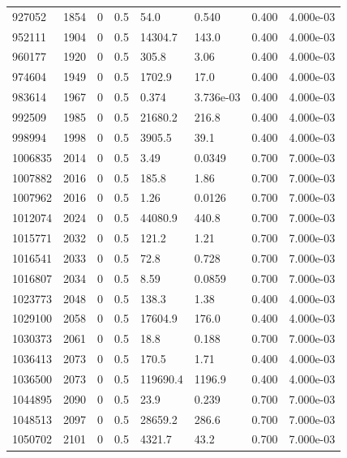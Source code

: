 \documentclass[preview]{standalone}
\begin{document}
{{{\begin{tabular}{L{1.2cm}C{1.2cm} C{0.3cm}C{0.5cm} C{1.4cm}C{1.4cm} C{1.4cm}C{1.4cm}}
  927052  &  1854  & 0     & 0.5 &  54.0  & 0.540  & 0.400 &  4.000e-03   \\ 
  952111  &  1904  & 0     & 0.5 &  14304.7  & 143.0  & 0.400 &  4.000e-03   \\ 
  960177  &  1920  & 0     & 0.5 &  305.8  & 3.06  & 0.400 &  4.000e-03   \\ 
  974604  &  1949  & 0     & 0.5 &  1702.9  & 17.0  & 0.400 &  4.000e-03   \\ 
  983614  &  1967  & 0     & 0.5 &  0.374  & 3.736e-03  & 0.400 &  4.000e-03   \\ 
  992509  &  1985  & 0     & 0.5 &  21680.2  & 216.8  & 0.400 &  4.000e-03   \\ 
  998994  &  1998  & 0     & 0.5 &  3905.5  & 39.1  & 0.400 &  4.000e-03   \\ 
  1006835  &  2014  & 0     & 0.5 &  3.49  & 0.0349  & 0.700 &  7.000e-03   \\ 
  1007882  &  2016  & 0     & 0.5 &  185.8  & 1.86  & 0.700 &  7.000e-03   \\ 
  1007962  &  2016  & 0     & 0.5 &  1.26  & 0.0126  & 0.700 &  7.000e-03   \\ 
  1012074  &  2024  & 0     & 0.5 &  44080.9  & 440.8  & 0.700 &  7.000e-03   \\ 
  1015771  &  2032  & 0     & 0.5 &  121.2  & 1.21  & 0.700 &  7.000e-03   \\ 
  1016541  &  2033  & 0     & 0.5 &  72.8  & 0.728  & 0.700 &  7.000e-03   \\ 
  1016807  &  2034  & 0     & 0.5 &  8.59  & 0.0859  & 0.700 &  7.000e-03   \\ 
  1023773  &  2048  & 0     & 0.5 &  138.3  & 1.38  & 0.400 &  4.000e-03   \\ 
  1029100  &  2058  & 0     & 0.5 &  17604.9  & 176.0  & 0.400 &  4.000e-03   \\ 
  1030373  &  2061  & 0     & 0.5 &  18.8  & 0.188  & 0.700 &  7.000e-03   \\ 
  1036413  &  2073  & 0     & 0.5 &  170.5  & 1.71  & 0.400 &  4.000e-03   \\ 
  1036500  &  2073  & 0     & 0.5 &  119690.4  & 1196.9  & 0.400 &  4.000e-03   \\ 
  1044895  &  2090  & 0     & 0.5 &  23.9  & 0.239  & 0.700 &  7.000e-03   \\ 
  1048513  &  2097  & 0     & 0.5 &  28659.2  & 286.6  & 0.700 &  7.000e-03   \\ 
  1050702  &  2101  & 0     & 0.5 &  4321.7  & 43.2  & 0.700 &  7.000e-03   \\ 

\end{tabular}}}}
\end{document}
